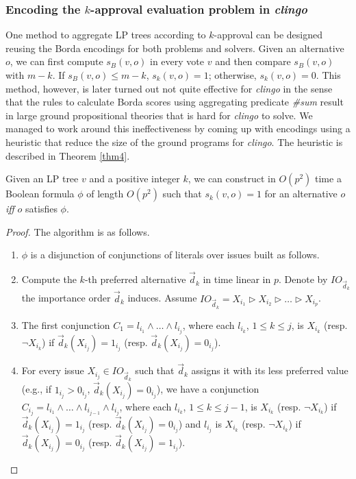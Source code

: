 \subsubsection{Encoding the $k$-approval evaluation problem in \emph{clingo}}
One method to aggregate LP trees according to $k$-approval can be designed
reusing the Borda encodings for both problems and solvers.  Given an alternative $o$,
we can first compute $s_B(v,o)$ in every vote $v$ and then compare $s_B(v,o)$
with $m-k$.  If $s_B(v,o) \leq m-k$, $s_k(v,o)=1$; otherwise, $s_k(v,o)=0$.
This method, however, is later turned out not quite effective for 
\emph{clingo} in the sense
that the rules to calculate Borda scores using aggregating predicate 
\textit{\#sum} result in large ground propositional theories that
is hard for \emph{clingo} to solve.  We managed to work around this
ineffectiveness by coming up with encodings using a heuristic that
reduce the size of the ground programs for \emph{clingo}.  The
heuristic is described in Theorem \ref{thm4}.

\begin{thm}
\label{thm4}
	Given an LP tree $v$ and a positive integer $k$, we can construct
	in $O(p^2)$ time a Boolean formula $\phi$ of length $O(p^2)$ such
	that $s_k(v,o)=1$ for an alternative $o$ \textit{iff} 
	$o$ satisfies $\phi$.
\end{thm}
\begin{proof}
	The algorithm is as follows.
	\begin{enumerate}
	  \item $\phi$ is a disjunction of conjunctions of literals over issues built as follows.
	  \item Compute the $k$-th preferred alternative $\vec{d}_k$ in time linear in $p$.  
	        Denote by $IO_{\vec{d}_k}$ the importance order $\vec{d}_k$ induces.  Assume 
	        $IO_{\vec{d}_k} = X_{i_1} \rhd X_{i_2} \rhd \ldots \rhd X_{i_p} $.
	  \item The first conjunction $C_1 = l_{i_1} \wedge \ldots \wedge l_{i_j}$, where 
	        each $l_{i_k}$, $1 \leq k \leq j$, is $X_{i_k}$ (resp. $\neg X_{i_k}$) 
	        if $\vec{d}_k(X_{i_j})=1_{i_j}$ (resp. $\vec{d}_k(X_{i_j})=0_{i_j}$).
	  \item For every issue $X_{i_j} \in IO_{\vec{d}_k}$ such that $\vec{d}_k$ assigns it 
	        with its less preferred value (e.g., if $1_{i_j} > 0_{i_j}$, $\vec{d}_k(X_{i_j})=0_{i_j}$), 
	        we have a conjunction $C_{i_j} = l_{i_1} \wedge \ldots \wedge l_{i_{j-1}} 
	        \wedge l_{i_j}$, where each $l_{i_k}$, $1 \leq k \leq j-1$, is $X_{i_k}$ (resp. $\neg X_{i_k}$) 
	        if $\vec{d}_k(X_{i_j})=1_{i_j}$ (resp. $\vec{d}_k(X_{i_j})=0_{i_j}$) and $l_{i_j}$ 
	        is $X_{i_k}$ (resp. $\neg X_{i_k}$) if $\vec{d}_k(X_{i_j})=0_{i_j}$ 
	        (resp. $\vec{d}_k(X_{i_j})=1_{i_j}$).
	\end{enumerate}
\end{proof}

